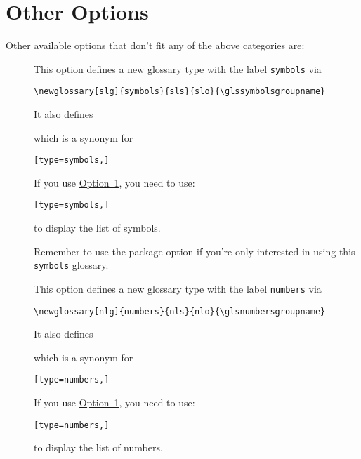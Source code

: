 \documentclass[report,inlinetitle]{nlctdoc}
\newcommand*{\opt}[1]{\hyperlink{option#1}{Option~#1}}
\begin{document}
\section{Other Options}
\label{sec:pkgopts-other}

Other available options that don't fit any of the above categories
are:
\begin{description}
\item[] This option defines a new glossary type with
the label \texttt{symbols} via
\begin{verbatim}
\newglossary[slg]{symbols}{sls}{slo}{\glssymbolsgroupname}
\end{verbatim}
It also defines
\begin{definition}[\DescribeMacro\printsymbols]
\end{definition}
which is a synonym for
\begin{alltt}
[type=symbols,]
\end{alltt}

If you use \opt1, you need to use:
\begin{alltt}
[type=symbols,]
\end{alltt}
to display the list of symbols.

\begin{important}
Remember to use the  package option if you're only
interested in using this \texttt{symbols} glossary.
\end{important}

\item[] This option defines a new glossary type with
the label \texttt{numbers} via
\begin{verbatim}
\newglossary[nlg]{numbers}{nls}{nlo}{\glsnumbersgroupname}
\end{verbatim}
It also defines
\begin{definition}[\DescribeMacro\printnumbers]
\end{definition}
which is a synonym for
\begin{alltt}
[type=numbers,]
\end{alltt}

If you use \opt1, you need to use:
\begin{alltt}
[type=numbers,]
\end{alltt}
to display the list of numbers.


\end{description}
\end{document}
